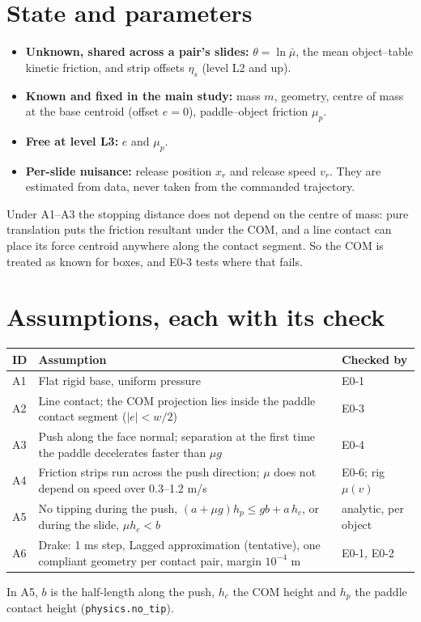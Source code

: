 \documentclass[10pt]{article}
\newcommand{\code}[1]{\texttt{#1}}
\begin{document}
\section{State and parameters}
\label{sec:state}
\begin{itemize}
\item \textbf{Unknown, shared across a pair's slides:} $\theta=\ln\bar\mu$, the mean object--table kinetic friction,
      and strip offsets $\eta_s$ (level L2 and up).
\item \textbf{Known and fixed in the main study:} mass $m$, geometry, centre of mass at the base centroid (offset $e=0$),
      paddle--object friction $\mu_p$.
\item \textbf{Free at level L3:} $e$ and $\mu_p$.
\item \textbf{Per-slide nuisance:} release position $x_r$ and release speed $v_r$.  They are estimated from data, never
      taken from the commanded trajectory.
\end{itemize}
Under A1--A3 the stopping distance does not depend on the centre of mass: pure translation puts the friction
resultant under the COM, and a line contact can place its force centroid anywhere along the contact segment.  So
the COM is treated as known for boxes, and E0-3 tests where that fails.

\section{Assumptions, each with its check}
\label{sec:assumptions}
\begin{center}\small
\begin{tabular}{@{}llp{3.2cm}@{}}
\toprule
ID & Assumption & Checked by\\
\midrule
A1 & Flat rigid base, uniform pressure & E0-1\\
A2 & Line contact; the COM projection lies inside the paddle contact segment ($|e|<w/2$) & E0-3\\
A3 & Push along the face normal; separation at the first time the paddle decelerates faster than $\mu g$ & E0-4\\
A4 & Friction strips run across the push direction; $\mu$ does not depend on speed over 0.3--1.2 m/s & E0-6; rig $\mu(v)$\\
A5 & No tipping during the push, $(a+\mu g)h_p\le gb+a\,h_c$, or during the slide, $\mu h_c<b$ & analytic, per object\\
A6 & Drake: 1 ms step, Lagged approximation (tentative), one compliant geometry per contact pair, margin $10^{-4}$ m & E0-1, E0-2\\
\bottomrule
\end{tabular}
\end{center}
In A5, $b$ is the half-length along the push, $h_c$ the COM height and $h_p$ the paddle contact height
(\code{physics.no\_tip}).
\end{document}
